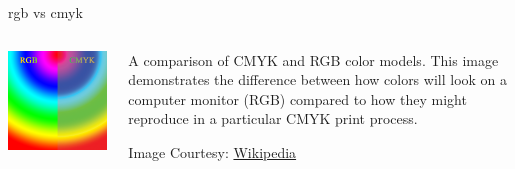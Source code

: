 \documentclass[aspectratio=169,xcolor={dvipsnames,svgnames}]{beamer}
\begin{document}
\begin{frame}[label={sec:orgc9b585f}]{rgb vs cmyk}
\begin{columns}
\begin{column}{.5\columnwidth}
\begin{center}
\includegraphics[width=.9\linewidth]{images/RGB_and_CMYK_comparison.png}
\end{center}
\end{column}

\begin{column}{.5\columnwidth}
A comparison of CMYK and RGB color models. This image
demonstrates the difference between how colors will
look on a computer monitor (RGB) compared to how they
might reproduce in a particular CMYK print process.

\vspace{\baselineskip}

Image Courtesy: \href{https://commons.wikimedia.org/wiki/File:RGB\_and\_CMYK\_comparison.png}{Wikipedia}
\end{column}
\end{columns}
\end{frame}
\end{document}
